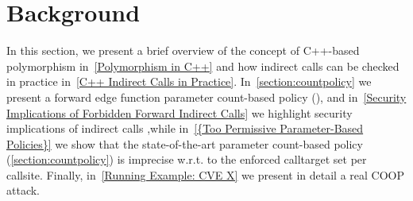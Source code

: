 \section{Background}
\label{C++ Bad Forward Indirect Calls}
In this section,
we present a brief overview of the concept of C++-based polymorphism in~\cref{Polymorphism in C++}
and how indirect calls can be checked in practice in~\cref{C++ Indirect Calls in Practice}.
In~\cref{section:countpolicy} we present a forward edge function parameter count-based policy (\cite{veen:typearmor}), and
in~\cref{Security Implications of Forbidden Forward Indirect Calls} we highlight security implications of indirect calls ,while
in~\cref{{Too Permissive Parameter-Based Policies}} we show that the state-of-the-art parameter count-based policy
(\cref{section:countpolicy}) is imprecise w.r.t. to the enforced calltarget set per callsite. 
Finally, in~\cref{Running Example: CVE X} we present in detail a real COOP attack.

